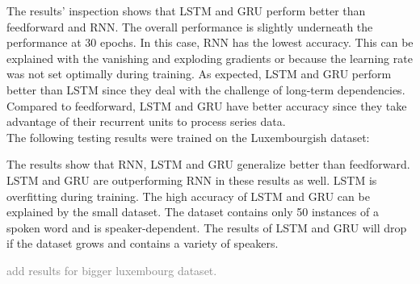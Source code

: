 The results' inspection shows that LSTM and GRU perform better than feedforward
and RNN. The overall performance is slightly underneath the performance at 30
epochs. In this case, RNN has the lowest accuracy. This can be explained with
the vanishing and exploding gradients or because the learning rate was not set
optimally during training. As expected, LSTM and GRU perform better than LSTM
since they deal with the challenge of long-term dependencies. Compared to
feedforward, LSTM and GRU have better accuracy since they take advantage of
their recurrent units to process series data.\\

The following testing results were trained on the Luxembourgish dataset:

\begin{table}[H]
    \centering
\end{table}

The results show that RNN, LSTM and GRU generalize better than feedforward.
LSTM and GRU are outperforming RNN in these results as well. LSTM is overfitting
during training. The high accuracy of LSTM and GRU can be explained by the small
dataset. The dataset contains only 50 instances of a spoken word and is
speaker-dependent. The results of LSTM and GRU will drop if the dataset grows
and contains a variety of speakers.

\textcolor{gray}{add results for bigger luxembourg dataset.}
